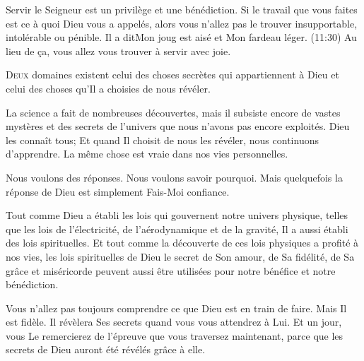 Servir le Seigneur est un privilège et une bénédiction.
 Si le travail que vous faites est ce à quoi Dieu vous a appelés,
 alors vous n'allez pas le trouver insupportable, intolérable ou pénible.
 Il a dit\frcolon \Og Mon joug est aisé et Mon fardeau léger. \Fg{}
 (11:30)
 Au lieu de \c{c}a, vous allez vous trouver à servir avec joie. 

\dvrule






\lettrine{D}{eux} domaines existent \ocadr celui des choses secrètes
 qui appartiennent à Dieu et celui des choses qu'Il a choisies de nous révéler.

La science a fait de nombreuses découvertes, mais il subsiste encore
 de vastes mystères et des secrets de l'univers que nous n'avons
 pas encore exploités.
 Dieu les connaît tous; Et quand Il choisit de nous les révéler,
 nous continuons d'apprendre.
 La même chose est vraie dans nos vies personnelles.


Nous voulons des réponses. Nous voulons savoir pourquoi.
 Mais quelquefois la réponse de Dieu est simplement\frcolon
 \Og Fais-Moi confiance. \Fg{}

Tout comme Dieu a établi les lois qui gouvernent notre univers physique,
 telles que les lois de l'électricité, de l'aérodynamique et de la gravité,
 Il a aussi établi des lois spirituelles.
 Et tout comme la découverte de ces lois physiques a profité à nos vies,
 les lois spirituelles de Dieu \ocadr le secret de Son amour, de Sa fidélité,
 de Sa grâce et miséricorde \fcadr{}
 peuvent aussi être utilisées pour notre bénéfice et notre bénédiction.

Vous n'allez pas toujours comprendre ce que Dieu est en train de faire.
 Mais Il est fidèle. Il révèlera Ses secrets quand vous vous attendrez à Lui.
 Et un jour, vous Le remercierez de l'épreuve que vous traversez maintenant,
 parce que les secrets de Dieu auront été révélés grâce à elle. 

